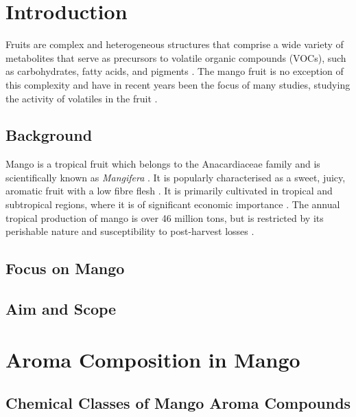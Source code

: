 \setcounter{chapter}{1}
\setcounter{section}{0}
\setlength{\headheight}{12.71342pt}
\addtolength{\topmargin}{-0.71342pt}

\section{Introduction}
Fruits are complex and heterogeneous structures that comprise  a wide variety of metabolites that serve as precursors to volatile organic compounds (VOCs), such as carbohydrates, fatty acids, and pigments \cite*{A03_PanoFarias2017}. The mango fruit is no exception of this complexity and have in recent years been the focus of many studies, studying the activity of volatiles in the fruit \cite*{A04_GUO2023112779}.


\subsection{Background}
Mango is a tropical fruit which belongs to the Anacardiaceae family and is scientifically known as \textit{Mangifera} \cite*{A04_GUO2023112779}. It is popularly characterised as a sweet, juicy, aromatic fruit with a low fibre flesh \cite*{A05_Chin2019}. It is primarily cultivated in tropical and subtropical regions, where it is of significant economic importance \cite*{A05_Chin2019}. 
The annual tropical production of mango is over 46 million tons, but is restricted by its perishable nature and susceptibility to post-harvest losses \cite*{A05_Chin2019}.


\subsection{Focus on Mango}
\subsection{Aim and Scope}


\section{Aroma Composition in Mango}
\subsection{Chemical Classes of Mango Aroma Compounds}
